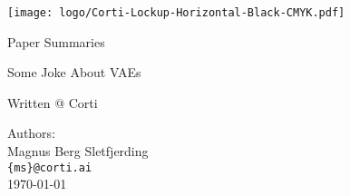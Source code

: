 \begin{titlepage}
\begin{center}

    \texttt{[image: logo/Corti-Lockup-Horizontal-Black-CMYK.pdf]}
    \vspace{1in}

    \rmfamily
    \huge
    Paper Summaries \\
    \vspace{1cm}
 

    \Large
    Some Joke About VAEs 
    
    \sffamily

    \vfill

    \large
    Written @ Corti \\


    \vspace{0.8cm}

    Authors:  \\
    Magnus Berg Sletfjerding \\
    
    \texttt{\{ms\}@corti.ai} \\

    \today \\
    
    \vspace{2cm}


\end{center}
\end{titlepage}
